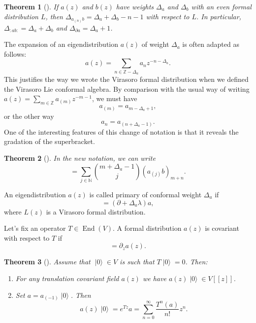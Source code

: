 \documentclass[a4paper, 12pt, reqno]{amsart}
\newtheorem{theorem}{Theorem}[section]
\theoremstyle{remark}
\numberwithin{equation}{subsection}
\DeclareMathOperator{\End}{End}
\DeclareMathOperator{\vac}{|0\rangle}
\begin{document}
\begin{theorem}[{\cite[Proposition 3.7.4]{nozaradan_introduction_2008}}]
  \label{thr:14}
  If $a(z)$ and $b(z)$ have weights $\Delta_a$ and $\Delta_b$ with an even formal distribution $L$, then $\Delta_{a_{(n)}b} = \Delta_a + \Delta_b - n - 1$ with respect to $L$.
  In particular, $\Delta_{:ab:} = \Delta_a + \Delta_b$ and $\Delta_{\partial a} = \Delta_a + 1$.
\end{theorem}

The expansion of an eigendistribution $a(z)$ of weight $\Delta_a$ is often adapted as follows:
\begin{equation*}
  a(z) = \sum_{n \in \mathbb{Z} - \Delta_a}a_nz^{-n - \Delta_a}.
\end{equation*}
This justifies the way we wrote the Virasoro formal distribution when we defined the Virasoro Lie conformal algebra.
By comparison with the usual way of writing $a(z) = \sum_{m \in \mathbb{Z}}a_{(m)}z^{-m - 1}$, we must have
\begin{equation*}
  a_{(m)} = a_{m - \Delta_a + 1},
\end{equation*}
or the other way
\begin{equation*}
  a_n = a_{(n + \Delta_a - 1)}.
\end{equation*}
One of the interesting features of this change of notation is that it reveals the gradation of the superbracket.

\begin{theorem}[{\cite[Proposition 3.7.6]{nozaradan_introduction_2008}}]
  \label{thr:15}
  In the new notation, we can write
  \begin{equation*}
    [a_m, b_n] = \sum_{j \in \mathbb{N}}\binom{m + \Delta_a - 1}{j}(a_{(j)}b)_{m + n}.
  \end{equation*}
\end{theorem}

An eigendistribution $a(z)$ is called primary of conformal weight $\Delta_a$ if
\begin{equation*}
  [L_\lambda a]=(\partial +\Delta_a\lambda)a,
\end{equation*}
where $L(z)$ is a Virasoro formal distribution.

Let's fix an operator $T \in \End(V)$.
A formal distribution $a(z)$ is covariant with respect to $T$ if
\begin{equation*}
  [T, a(z)] = \partial_za(z).
\end{equation*}

\begin{theorem}[{\cite[Lemma 1]{callegaro_introduction_2017}}]
  \label{thr:16}
  Assume that $\vac \in V$ is such that $T\vac = 0$.
  Then:
  \begin{enumerate}
  \item For any translation covariant field $a(z)$ we have $a(z)\vac \in V[[z]]$.
  \item Set $a = a_{(-1)}\vac$.
    Then
    \begin{equation*}
      a(z)\vac = e^{Tz}a = \sum_{n = 0}^\infty\frac{T^n(a)}{n!}z^n.
    \end{equation*}
  \end{enumerate}
\end{theorem}
\end{document}
